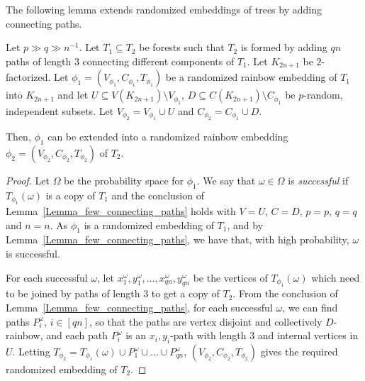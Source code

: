 The following lemma extends randomized embeddings of trees by adding connecting paths.
\begin{lemma}\label{Lemma_extending_with_connecting_paths}
Let $p\gg q\gg n^{-1}$.
Let $T_1\subseteq T_2$ be forests such that $T_2$ is formed by adding $qn$ paths of length $3$ connecting different components of $T_1$. Let  $K_{2n+1}$ be $2$-factorized.
Let $\phi_1=(V_{\phi_1}, C_{\phi_1}, T_{\phi_1})$ be a randomized rainbow embedding of $T_1$ into $K_{2n+1}$ and  let $U\subseteq V(K_{2n+1})\setminus V_{\phi_1}$, $D\subseteq C(K_{2n+1})\setminus C_{\phi_1}$ be $p$-random, independent subsets. Let $V_{\phi_2}=V_{\phi_1}\cup U$ and $C_{\phi_2}=C_{\phi_1}\cup D$.

Then, $\phi_1$ can be extended into a randomized rainbow embedding $\phi_2=(V_{\phi_2}, C_{\phi_2}, T_{\phi_2})$ of $T_2$.
\end{lemma}
\begin{proof}
Let $\Omega$ be the probability space for $\phi_1$.
We say that $\omega\in \Omega$ is \emph{successful} if $T_{\phi_1}(\omega)$ is a copy of $T_1$ and the conclusion of Lemma~\ref{Lemma_few_connecting_paths} holds with $V=U$, $C=D$, $p=p$, $q=q$ and $n=n$. As $\phi_1$ is a randomized embedding of $T_1$, and by Lemma~\ref{Lemma_few_connecting_paths}, we have that, with high probability, $\omega$ is successful.

For each successful $\omega$, let $x_1^{\omega}, y_1^{\omega}, \dots, x_{qn}^{\omega}, y_{qn}^{\omega}$ be the vertices of $T_{\phi_1}(\omega)$ which need to be joined by paths of length $3$ to get a copy of $T_2$. From the conclusion of Lemma~\ref{Lemma_few_connecting_paths}, for each successful $\omega$, we can find paths $P_i^\omega$, $i\in [qn]$, so that the paths are vertex disjoint and collectively $D$-rainbow, and each path $P_i^\omega$ is an $x_i,y_i$-path with length 3 and internal vertices in $U$.
Letting $T_{\phi_2}=T_{\phi_1}(\omega)\cup P_1^{\omega}\cup \dots\cup P_{qn}^{\omega}$, $(V_{\phi_2}, C_{\phi_2}, T_{\phi_2})$ gives the required randomized embedding of $T_2$.
\end{proof}


